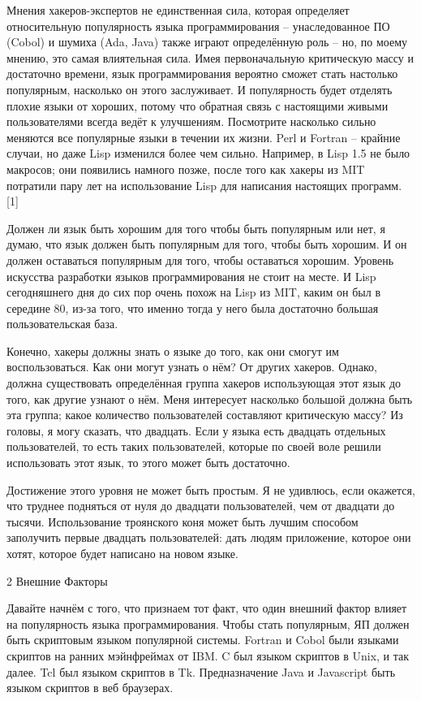 \documentclass[ebook,12pt,oneside,openany]{memoir}
\begin{document}
Мнения хакеров-экспертов не единственная сила, которая определяет
относительную популярность языка программирования -- унаследованное ПО
(Cobol) и шумиха (Ada, Java) также играют определённую роль -- но, по
моему мнению, это самая влиятельная сила. Имея первоначальную
критическую массу и достаточно времени, язык программирования вероятно
сможет стать настолько популярным, насколько он этого заслуживает. И
популярность будет отделять плохие языки от хороших, потому что
обратная связь с настоящими живыми пользователями всегда ведёт к
улучшениям. Посмотрите насколько сильно меняются все популярные языки
в течении их жизни. Perl и Fortran -- крайние случаи, но даже Lisp
изменился более чем сильно. Например, в Lisp 1.5 не было макросов; они
появились намного позже, после того как хакеры из MIT потратили пару
лет на использование Lisp для написания настоящих программ. [1]

Должен ли язык быть хорошим для того чтобы быть популярным или нет, я
думаю, что язык должен быть популярным для того, чтобы быть хорошим. И
он должен оставаться популярным для того, чтобы оставаться хорошим.
Уровень искусства разработки языков программирования не стоит на
месте. И Lisp сегодняшнего дня до сих пор очень похож на Lisp из MIT,
каким он был в середине 80, из-за того, что именно тогда у него была
достаточно большая пользовательская база.

Конечно, хакеры должны знать о языке до того, как они смогут им
воспользоваться. Как они могут узнать о нём? От других хакеров.
Однако, должна существовать определённая группа хакеров использующая
этот язык до того, как другие узнают о нём. Меня интересует насколько
большой должна быть эта группа; какое количество пользователей
составляют критическую массу? Из головы, я могу сказать, что двадцать.
Если у языка есть двадцать отдельных пользователей, то есть таких
пользователей, которые по своей воле решили использовать этот язык, то
этого может быть достаточно.

Достижение этого уровня не может быть простым. Я не удивлюсь, если
окажется, что труднее подняться от нуля до двадцати пользователей, чем
от двадцати до тысячи. Использование троянского коня может быть лучшим
способом заполучить первые двадцать пользователей: дать людям
приложение, которое они хотят, которое будет написано на новом языке.

2 Внешние Факторы

Давайте начнём с того, что признаем тот факт, что один внешний фактор
влияет на популярность языка программирования. Чтобы стать популярным,
ЯП должен быть скриптовым языком популярной системы. Fortran и Cobol
были языками скриптов на ранних мэйнфреймах от IBM. C был языком
скриптов в Unix, и так далее. Tcl был языком скриптов в Tk.
Предназначение Java и Javascript быть языком скриптов в веб браузерах.
\end{document}
